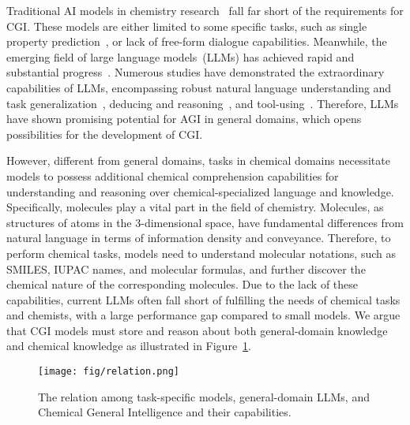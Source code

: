 Traditional AI models in chemistry research~\cite{zhou2022uni,edwards-etal-2022-translation,christofidellis2023unifying,liu-etal-2023-molxpt,cao2023instructmol} fall far short of the requirements for CGI.
These models are either limited to some specific tasks, such as single property prediction~\cite{zhou2022uni,wu2023molformer}, or lack of free-form dialogue capabilities. Meanwhile, the emerging field of large language models~(LLMs) has achieved rapid and substantial progress~\cite{touvron2023llama,du-etal-2022-glm,xu-etal-2023-baize}. Numerous studies have demonstrated the extraordinary capabilities of LLMs, encompassing robust natural language understanding and task generalization~\cite{xu-etal-2023-baize,wei2021finetuned}, deducing and reasoning~\cite{wei2022chain,kojima2022large}, and tool-using~\cite{schick2023toolformer,bran2023chemcrow}. Therefore, LLMs have shown promising potential for AGI in general domains, which opens possibilities for the development of CGI.

However, different from general domains, tasks in chemical domains necessitate models to possess additional chemical comprehension capabilities for understanding and reasoning over chemical-specialized language and knowledge.
Specifically, molecules play a vital part in the field of chemistry.
Molecules, as structures of atoms in the 3-dimensional space, have fundamental differences from natural language in terms of information density and conveyance. Therefore, to perform chemical tasks, models need to understand molecular notations, such as SMILES, IUPAC names, and molecular formulas, and further discover the chemical nature of the corresponding molecules.
Due to the lack of these capabilities, current LLMs often fall short of fulfilling the needs of chemical tasks and chemists, with a large performance gap compared to small models.
We argue that CGI models must store and reason about both general-domain knowledge and chemical knowledge as illustrated in Figure~\ref{fig:relation}.

\begin{figure}
    \centering
    \texttt{[image: fig/relation.png]}
    \caption{The relation among task-specific models, general-domain LLMs, and Chemical General Intelligence and their capabilities.}
    \label{fig:relation}
    \vspace{-3mm}
\end{figure}

